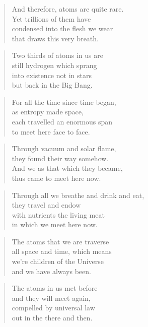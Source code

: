 \documentclass[10pt,a4paper]{article}
\begin{document}
\begin{multicols}{2}
\begin{verse}
And therefore, atoms are quite rare.\\
Yet trillions of them have\\
condensed into the flesh we wear\\
that draws this very breath.
\end{verse}

\begin{verse}
Two thirds of atoms in us are\\
still hydrogen which sprang\\
into existence not in stars\\
but back in the Big Bang.
\end{verse}

\begin{verse}
For all the time since time began,\\
as entropy made space,\\
each travelled an enormous span\\
to meet here face to face.
\end{verse}

\begin{verse}
Through vacuum and solar flame,\\
they found their way somehow.\\
And we as that which they became,\\
thus came to meet here now.
\end{verse}

\begin{verse}
Through all we breathe and drink and eat,\\
they travel and endow\\
with nutrients the living meat\\
in which we meet here now.
\end{verse}

\begin{verse}
The atoms that we are traverse\\
all space and time, which means\\
we’re children of the Universe\\
and we have always been.
\end{verse}

\begin{verse}
The atoms in us met before\\
and they will meet again,\\
compelled by universal law\\
out in the there and then.
\end{verse}


\end{multicols}
\end{document}
